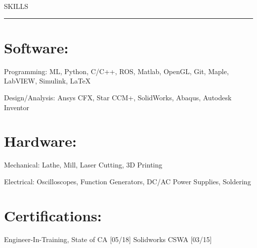 \documentclass[letterpaper,10pt,oneside]{article}
\begin{document}
\begin{body}

{
\hspace{-1.72in}\noindent\color{cblue}
{SKILLS} %
}

\vspace{-1ex}
{\hspace{-1.73in}\noindent\color{dblue}\rule{6.935in}{0.4pt}} %
\vspace{-5.5ex}

\section
{Software:}{}

\vspace{-2.5ex}
\begin{detail}
Programming: ML, Python, C/C++, ROS, Matlab, OpenGL, Git, Maple, LabVIEW, Simulink, \LaTeX
\end{detail}

\begin{detail}
Design/Analysis: Ansys CFX, Star CCM+, SolidWorks, Abaqus, Autodesk Inventor
\end{detail}
\vspace{0.5ex}

\vspace{-1.5ex}
\section
{Hardware:}{}

\vspace{-2.5ex}
\begin{detail}
Mechanical: Lathe, Mill, Laser Cutting, 3D Printing
\end{detail}

\begin{detail}
Electrical: Oscilloscopes, Function Generators, DC/AC Power Supplies, Soldering
\end{detail}
\vspace{0.5ex}

\vspace{-2.5ex}
\section
{Certifications:}{}

\vspace{-2.0ex}
\begin{detail}
Engineer-In-Training, State of CA [05/18]  
\newline
Solidworks CSWA [03/15]
\end{detail}


\end{body}
\end{document}

